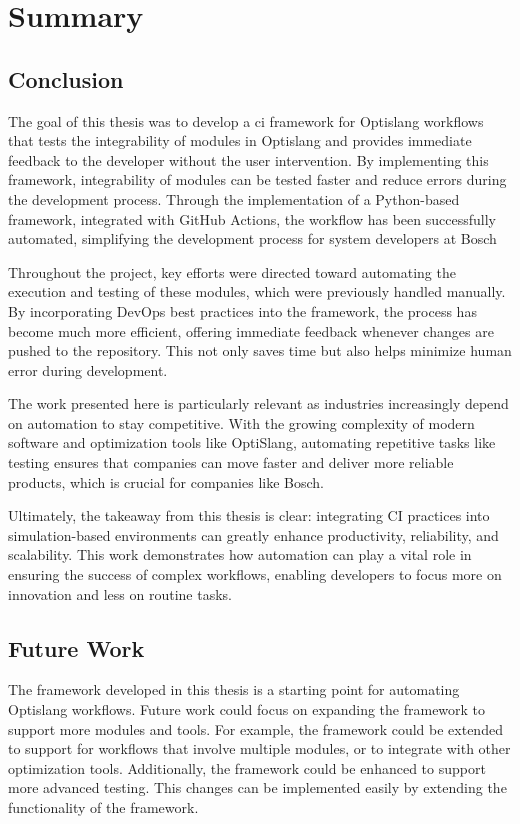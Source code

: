 \chapter{Summary}
\section{Conclusion}
The goal of this thesis was to develop a \acrlong{ci} framework for Optislang workflows that tests the integrability of modules in Optislang and provides immediate feedback to the developer
without the user intervention. 
By implementing this framework, integrability of modules can be tested faster and reduce errors during the development process. Through the implementation of a Python-based framework, 
integrated with GitHub Actions, the workflow has been successfully automated, simplifying the development process for system developers at Bosch

Throughout the project, key efforts were directed toward automating the execution and testing of these modules, which were previously handled manually. 
By incorporating DevOps best practices into the framework, the process has become much more efficient, offering immediate feedback whenever changes are 
pushed to the repository. This not only saves time but also helps minimize human error during development.

The work presented here is particularly relevant as industries increasingly depend on automation to stay competitive. With the growing complexity of modern 
software and optimization tools like OptiSlang, automating repetitive tasks like testing ensures that companies can move faster and deliver more reliable 
products, which is crucial for companies like Bosch.

Ultimately, the takeaway from this thesis is clear: integrating CI practices into simulation-based environments can greatly enhance productivity, reliability, 
and scalability. This work demonstrates how automation can play a vital role in ensuring the success of complex workflows, enabling developers to focus more 
on innovation and less on routine tasks.

\section{Future Work}
The framework developed in this thesis is a starting point for automating Optislang workflows. Future work could focus on expanding the framework to support 
more modules and tools. For example, the framework could be extended to support for workflows that involve multiple modules, or to integrate with other 
optimization tools. Additionally, the framework could be enhanced to support more advanced testing. This changes can be implemented easily by extending the 
functionality of the framework. 

